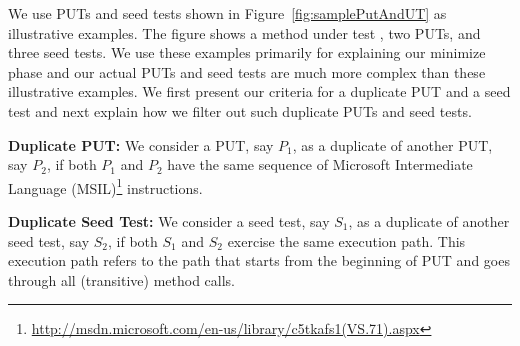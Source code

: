 We use PUTs and seed tests shown in Figure~\ref{fig:samplePutAndUT} as illustrative examples. The figure shows a method under test , two PUTs, and three seed tests. We use these examples primarily for explaining our minimize phase and our actual PUTs and seed tests are much more complex than these illustrative examples. We first present our criteria for a duplicate PUT and a seed test and next explain how we filter out such duplicate PUTs and seed tests.

\textbf{Duplicate PUT:} We consider a PUT, say $P_1$, as a duplicate of another PUT, say $P_2$, if both $P_1$ and $P_2$ have the same sequence of Microsoft Intermediate Language (MSIL)\footnote{\url{http://msdn.microsoft.com/en-us/library/c5tkafs1(VS.71).aspx}} instructions.

\textbf{Duplicate Seed Test:} We consider a seed test, say $S_1$, as a duplicate of another seed test, say $S_2$, if both $S_1$ and $S_2$ exercise the same execution path.
This execution path refers to the path that starts from the beginning of PUT and goes through all (transitive) method calls.

